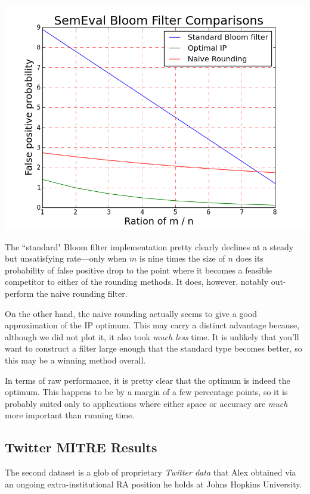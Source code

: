\documentclass[11pt]{article}
\begin{document}
\begin{center}
\includegraphics[scale=0.25]{resultsse.png}
\end{center}

The ``standard" Bloom filter implementation pretty clearly declines at a steady but unsatisfying rate---only when $m$ is nine times the size of $n$ does its probability of false positive drop to the point where it becomes a feasible competitor to either of the rounding methods. It does, however, notably out-perform the naive rounding filter.

On the other hand, the naive rounding actually seems to give a good approximation of the IP optimum. This may carry a distinct advantage because, although we did not plot it, it also took \textit{much less} time. It is unlikely that you'll want to construct a filter large enough that the standard type becomes better, so this may be a winning method overall.

In terms of raw performance, it is pretty clear that the optimum is indeed the optimum. This happens to be by a margin of a few percentage points, so it is probably suited only to applications where either space or accuracy are \textit{much} more important than running time.





\subsection{Twitter MITRE Results}

The second dataset is a glob of proprietary \textit{Twitter data} that Alex obtained via an ongoing extra-institutional RA position he holds at Johns Hopkins University.
\end{document}
